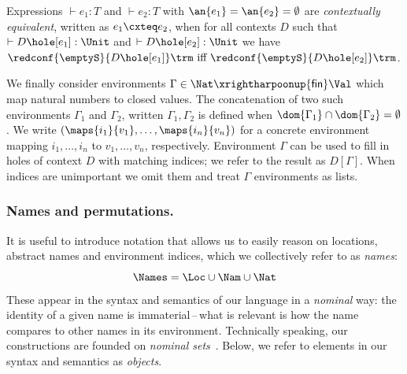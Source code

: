 \begin{definition}\label{def:cxt-equiv}
  Expressions $\vdash e_1:T$ and $\vdash e_2:T$
with $\an{e_1}=\an{e_2}=\emptyset$
  are \emph{contextually equivalent}, written as $e_1 \cxteq e_2$, when for all contexts $D$ such that $\vdash D\hole[e_1]: \Unit$ and $\vdash D\hole[e_2]: \Unit$ we have
$
    \redconf{\emptyS}{D\hole[e_1]}\trm ~\text{iff}~
    \redconf{\emptyS}{D\hole[e_2]}\trm
$.
\end{definition}


We finally consider environments $\Gamma \in \Nat \xrightharpoonup{\mathsf{fin}} \Val$ which map natural numbers to closed values.
The concatenation of two such environments $\Gamma_1$ and $\Gamma_2$, written $\Gamma_1,\Gamma_2$ is defined when $\dom{\Gamma_1}\cap\dom{\Gamma_2}=\emptyset$.
We write $(\maps{i_1}{v_1}, \ldots, \maps{i_n}{v_n})$ for a concrete environment mapping $i_1, \ldots, i_n$ to $v_1, \ldots, v_n$, respectively.
Environment $\Gamma$ can be used to fill in holes of context $D$ with matching indices; we refer to the result as $D[\Gamma]$. 
When indices are unimportant we omit them and treat $\Gamma$ environments as lists.


\subsubsection*{Names and permutations.}

It is useful to introduce notation that allows us to easily reason on locations, abstract names and environment indices, which we collectively refer to as \emph{names}:
\[
  \Names = \Loc\cup\Nam\cup\Nat
\]%
These appear in the syntax and semantics of our language
in a \emph{nominal} way: the identity of a given name is immaterial\,--\,what is relevant is how the name compares to other names in its environment.
Technically speaking, our constructions are founded on \emph{nominal sets}~\cite{PittsNominal}. Below, we refer to elements in our syntax and semantics as \emph{objects}.

